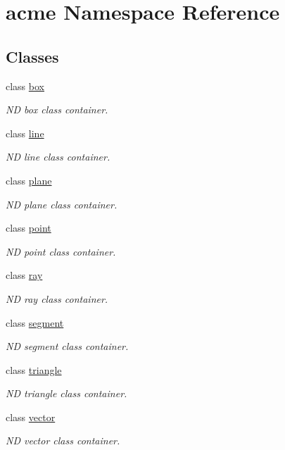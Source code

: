 \hypertarget{namespaceacme}{}\section{acme Namespace Reference}
\label{namespaceacme}
\subsection*{Classes}
\begin{DoxyCompactItemize}
\item 
class \hyperlink{classacme_1_1box}{box}
\begin{DoxyCompactList}\small\item\em ND box class container. \end{DoxyCompactList}\item 
class \hyperlink{classacme_1_1line}{line}
\begin{DoxyCompactList}\small\item\em ND line class container. \end{DoxyCompactList}\item 
class \hyperlink{classacme_1_1plane}{plane}
\begin{DoxyCompactList}\small\item\em ND plane class container. \end{DoxyCompactList}\item 
class \hyperlink{classacme_1_1point}{point}
\begin{DoxyCompactList}\small\item\em ND point class container. \end{DoxyCompactList}\item 
class \hyperlink{classacme_1_1ray}{ray}
\begin{DoxyCompactList}\small\item\em ND ray class container. \end{DoxyCompactList}\item 
class \hyperlink{classacme_1_1segment}{segment}
\begin{DoxyCompactList}\small\item\em ND segment class container. \end{DoxyCompactList}\item 
class \hyperlink{classacme_1_1triangle}{triangle}
\begin{DoxyCompactList}\small\item\em ND triangle class container. \end{DoxyCompactList}\item 
class \hyperlink{classacme_1_1vector}{vector}
\begin{DoxyCompactList}\small\item\em ND vector class container. \end{DoxyCompactList}\end{DoxyCompactItemize}

